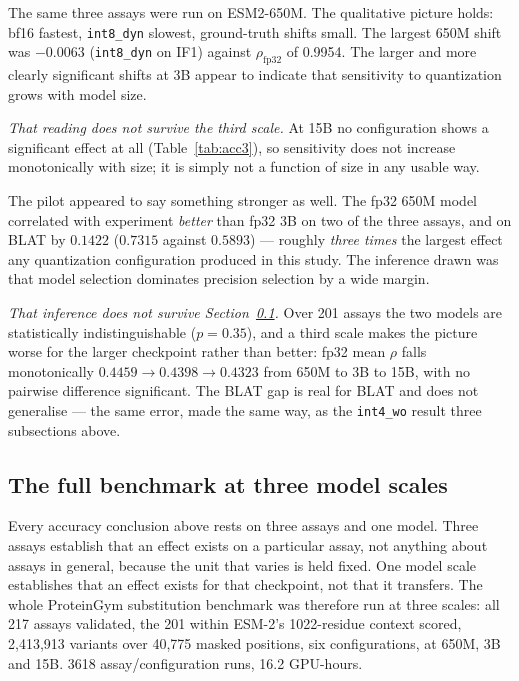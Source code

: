 \documentclass[11pt]{article}
\newcommand{\cfg}[1]{\texttt{#1}}
\begin{document}
The same three assays were run on ESM2-650M. The qualitative picture holds:
bf16 fastest, \cfg{int8\_dyn} slowest, ground-truth shifts small. The largest
650M shift was $-0.0063$ (\cfg{int8\_dyn} on IF1) against $\rho_{\text{fp32}}$
of 0.9954. The larger and more clearly significant shifts at 3B appear to
indicate that sensitivity to quantization grows with model size.

\emph{That reading does not survive the third scale.} At 15B no configuration
shows a significant effect at all (Table~\ref{tab:acc3}), so sensitivity does
not increase monotonically with size; it is simply not a function of size in any
usable way.

The pilot appeared to say something stronger as well. The fp32 650M model
correlated with experiment \emph{better} than fp32 3B on two of the three
assays, and on BLAT by $0.1422$ ($0.7315$ against $0.5893$) --- roughly
\emph{three times} the largest effect any quantization configuration produced in
this study. The inference drawn was that model selection dominates precision
selection by a wide margin.

\emph{That inference does not survive Section~\ref{sec:full}.} Over 201 assays
the two models are statistically indistinguishable ($p=0.35$), and a third scale
makes the picture worse for the larger checkpoint rather than better: fp32 mean
$\rho$ falls monotonically $0.4459 \to 0.4398 \to 0.4323$ from 650M to 3B to
15B, with no pairwise difference significant. The BLAT gap is real for BLAT and
does not generalise --- the same error, made the same way, as the
\cfg{int4\_wo} result three subsections above.

\subsection{The full benchmark at three model scales}
\label{sec:full}

Every accuracy conclusion above rests on three assays and one model. Three
assays establish that an effect exists on a particular assay, not anything about
assays in general, because the unit that varies is held fixed. One model scale
establishes that an effect exists for that checkpoint, not that it transfers.
The whole ProteinGym substitution benchmark was therefore run at three scales:
all 217 assays validated, the 201 within ESM-2's 1022-residue context scored,
2{,}413{,}913 variants over 40{,}775 masked positions, six configurations, at
650M, 3B and 15B. 3618 assay/configuration runs, 16.2 GPU-hours.
\end{document}

